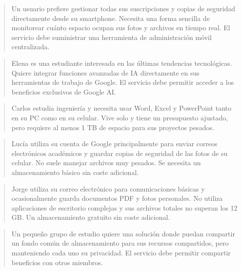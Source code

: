 \documentclass[letterpaper,10pt,spanish]{sphinxmanual}
\begin{document}
\begin{enumerate}
\begin{quote}
\sphinxAtStartPar
{} Un usuario prefiere gestionar todas sus suscripciones y copias de seguridad directamente desde su smartphone. Necesita una forma sencilla de monitorear cuánto espacio ocupan sus fotos y archivos en tiempo real. El servicio debe suministrar una herramienta de administración móvil centralizada.
\end{quote}
\begin{quote}

\sphinxAtStartPar
{} Elena es una estudiante interesada en las últimas tendencias tecnológicas. Quiere integrar funciones avanzadas de IA directamente en sus herramientas de trabajo de Google. El servicio debe permitir acceder a los beneficios exclusivos de Google AI.
\end{quote}
\begin{quote}

\sphinxAtStartPar
{} Carlos estudia ingeniería y necesita usar Word, Excel y PowerPoint tanto en su PC como en su celular. Vive solo y tiene un presupuesto ajustado, pero requiere al menos 1 TB de espacio para sus proyectos pesados.
\end{quote}
\begin{quote}

\sphinxAtStartPar
{} Lucía utiliza su cuenta de Google principalmente para enviar correos electrónicos académicos y guardar copias de seguridad de las fotos de su celular. No suele manejar archivos muy pesados. Se necesita un almacenamiento básico sin coste adicional.
\end{quote}
\begin{quote}

\sphinxAtStartPar
{} Jorge utiliza su correo electrónico para comunicaciones básicas y ocasionalmente guarda documentos PDF y fotos personales. No utiliza aplicaciones de escritorio complejas y sus archivos totales no superan los 12 GB. Un almacenamiento gratuito sin coste adicional.
\end{quote}
\begin{quote}

\sphinxAtStartPar
{} Un pequeño grupo de estudio quiere una solución donde puedan compartir un fondo común de almacenamiento para sus recursos compartidos, pero manteniendo cada uno su privacidad. El servicio debe permitir compartir beneficios con otros miembros.
\end{quote}
\begin{quote}


\end{quote}
\end{enumerate}
\end{document}
